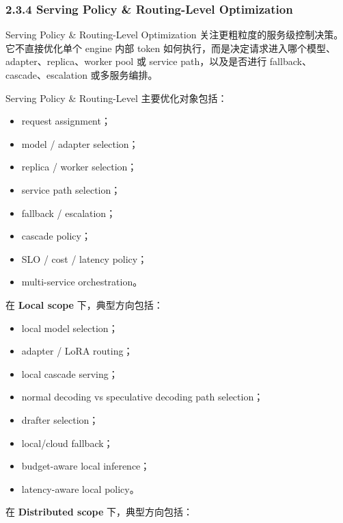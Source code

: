 \documentclass[a4paper,10pt]{ctexart}
\begin{document}
\subsubsection*{2.3.4 Serving Policy \& Routing-Level Optimization}

Serving Policy \& Routing-Level Optimization 关注更粗粒度的服务级控制决策。它不直接优化单个 engine 内部 token 如何执行，而是决定请求进入哪个模型、adapter、replica、worker pool 或 service path，以及是否进行 fallback、cascade、escalation 或多服务编排。


Serving Policy \& Routing-Level 主要优化对象包括：


\begin{itemize}
\item request assignment；

\item model / adapter selection；

\item replica / worker selection；

\item service path selection；

\item fallback / escalation；

\item cascade policy；

\item SLO / cost / latency policy；

\item multi-service orchestration。

\end{itemize}
在 \textbf{Local scope} 下，典型方向包括：


\begin{itemize}
\item local model selection；

\item adapter / LoRA routing；

\item local cascade serving；

\item normal decoding vs speculative decoding path selection；

\item drafter selection；

\item local/cloud fallback；

\item budget-aware local inference；

\item latency-aware local policy。

\end{itemize}
在 \textbf{Distributed scope} 下，典型方向包括：
\end{document}
